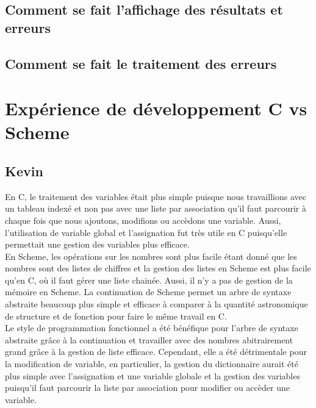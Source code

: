 \documentclass[a4paper,12pt,french]{article}
\begin{document}
	\subsection{Comment se fait l'affichage des résultats et erreurs}
	\subsection{Comment se fait le traitement des erreurs}
	\newpage
	\section{Expérience de développement C vs Scheme}
	\subsection{Kevin}
	En C, le traitement des variables était plus simple puisque nous travaillions avec un tableau indexé et non pas avec une liste par association qu'il faut parcourir à chaque fois que nous ajoutons, modifions ou accèdons une variable. Aussi, l'utilisation de variable global et l'assignation fut très utile en C puisqu'elle permettait une gestion des variables plus efficace.\\
	
	En Scheme, les opérations sur les nombres sont plus facile étant donné que les nombres sont des listes de chiffres et la gestion des listes en Scheme est plus facile qu'en C, où il faut gérer une liste chainée. Aussi, il n'y a pas de gestion de la mémoire en Scheme. La continuation de Scheme permet un arbre de syntaxe abstraite beaucoup plus simple et efficace à comparer à la quantité astronomique de structure et de fonction pour faire le même travail en C.\\
	
	Le style de programmation fonctionnel a été bénéfique pour l'arbre de syntaxe abstraite grâce à la continuation et travailler avec des nombres abitrairement grand grâce à la gestion de liste efficace. Cependant, elle a été détrimentale pour la modification de variable, en particulier, la gestion du dictionnaire aurait été plus simple avec l'assignation et une variable globale et la gestion des variables puisqu'il faut parcourir la liste par association pour modifier ou accèder une variable.\\
\end{document}
